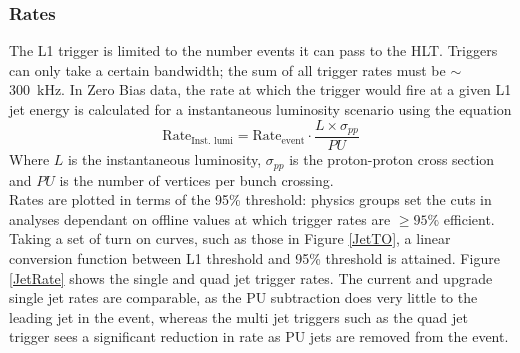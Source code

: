 \subsubsection{\sc Rates}
The L1 trigger is limited to the number events it can pass to the HLT. Triggers can only take a certain bandwidth; the sum of all trigger rates must be $\sim$ 300~kHz. 
In Zero Bias data, the rate at which the trigger would fire at a given L1 jet energy is calculated for a instantaneous luminosity scenario using the equation
\begin{equation}
\text{Rate}_{\text{Inst. lumi}} = \text{Rate}_{\text{event}} \cdot \frac{L\times \sigma_{pp}}{PU}
\end{equation}
Where $L$ is the instantaneous luminosity, $\sigma_{pp}$ is the proton-proton cross section and $PU$ is the number of vertices per bunch crossing.\\
Rates are plotted in terms of the 95\% threshold: physics groups set the cuts in analyses dependant on offline values at which trigger rates are $\geq 95\%$ efficient. Taking a set of turn on curves, such as those in Figure \ref{JetTO}, a linear conversion function between L1 threshold and 95\% threshold is attained.
Figure \ref{JetRate} shows the single and quad jet trigger rates. The current and upgrade single jet rates are comparable, as the PU subtraction does very little to the leading jet in the event, whereas the multi jet triggers such as the quad jet trigger sees a significant reduction in rate as PU jets are removed from the event.     


